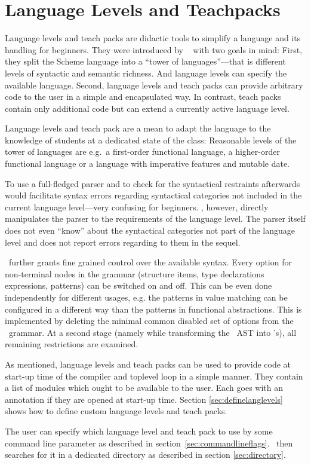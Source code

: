 
\section{Language Levels and Teachpacks}
\label{sec:teachpacks}

Language levels and teach packs are didactic tools to simplify a language and
its handling for beginners. They were introduced by \drscheme\
\citep{Felleisen98thedrscheme}  with two goals in mind:
First, they split the Scheme language into a ``tower of languages''---that is
different levels of syntactic and semantic richness.
And language levels can specify the available language.
Second, language levels and teach packs can provide arbitrary code to
the user in a simple and encapsulated way. In contrast, teach packs contain only
additional code but can extend a currently active language level.

Language levels and teach pack are a mean to adapt the language to the
knowledge of students at a dedicated state of the class: Reasonable levels of
the tower of languages are e.g.\ a first-order functional language, a
higher-order functional language or a language with imperative features and
mutable date.

To use a full-fledged parser and to check for the syntactical restraints afterwards
would facilitate syntax errors regarding syntactical categories not included in
the current language level---very confusing for beginners. 
\easyocaml, however, directly manipulates the parser to the requirements of the
language level.
The parser itself does not even ``know'' about the syntactical
categories not part of the language level and  does not report errors regarding
to them in the sequel.

\easyocaml\ further grants fine grained control over the available syntax.
Every option for non-terminal nodes in the grammar (structure items, type
declarations  expressions, patterns) can be switched on and off. This can be
even done independently for different usages, e.g. the patterns in value
matching can be configured in a different way than the patterns in functional
abstractions.
This is implemented by deleting the minimal common disabled set of options from
the \camlpf\ grammar.
At a second stage (namely while transforming the \ocaml\ AST into
\easyocaml's), all remaining restrictions are examined.

As mentioned, language levels and teach packs can be used to provide code at
start-up time of the compiler and toplevel loop in a simple manner. They contain
a list of modules which ought to be available to the user. Each goes with an
annotation if they are opened at start-up time.
Section \ref{sec:definelanglevels} shows how to define custom language levels
and teach packs.

The user can specify which language level and teach pack to use by some command
line parameter as described in section~\ref{sec:commandlineflags}.
\easyocaml\ then searches for it in a dedicated directory as described in
section \ref{sec:directory}.


